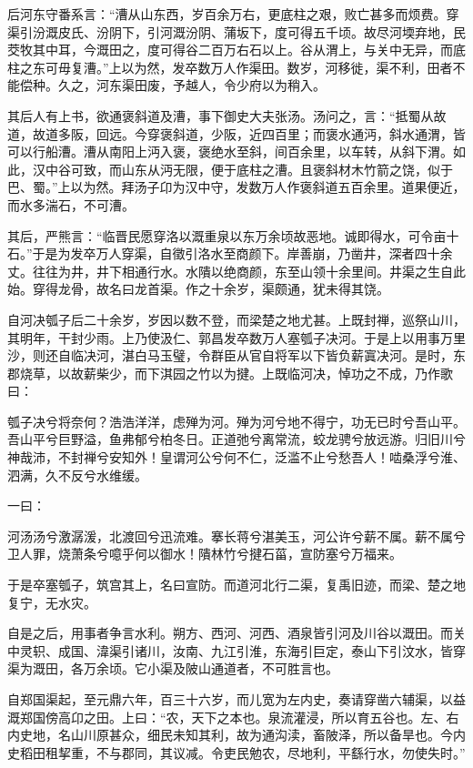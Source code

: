 \documentclass[]{article}
\begin{document}
后河东守番系言：``漕从山东西，岁百余万右，更底柱之艰，败亡甚多而烦费。穿渠引汾溉皮氏、汾阴下，引河溉汾阴、蒲坂下，度可得五千顷。故尽河堧弃地，民茭牧其中耳，今溉田之，度可得谷二百万右石以上。谷从渭上，与关中无异，而底柱之东可毋复漕。''上以为然，发卒数万人作渠田。数岁，河移徙，渠不利，田者不能偿种。久之，河东渠田废，予越人，令少府以为稍入。

其后人有上书，欲通褒斜道及漕，事下御史大夫张汤。汤问之，言：``抵蜀从故道，故道多阪，回远。今穿褒斜道，少阪，近四百里；而褒水通沔，斜水通渭，皆可以行船漕。漕从南阳上沔入褒，褒绝水至斜，间百余里，以车转，从斜下渭。如此，汉中谷可致，而山东从沔无限，便于底柱之漕。且褒斜材木竹箭之饶，似于巴、蜀。''上以为然。拜汤子卬为汉中守，发数万人作褒斜道五百余里。道果便近，而水多湍石，不可漕。

其后，严熊言：``临晋民愿穿洛以溉重泉以东万余顷故恶地。诚即得水，可令亩十石。''于是为发卒万人穿渠，自徵引洛水至商颜下。岸善崩，乃凿井，深者四十余丈。往往为井，井下相通行水。水隤以绝商颜，东至山领十余里间。井渠之生自此始。穿得龙骨，故名曰龙首渠。作之十余岁，渠颇通，犹未得其饶。

自河决瓠子后二十余岁，岁因以数不登，而梁楚之地尤甚。上既封禅，巡祭山川，其明年，干封少雨。上乃使汲仁、郭昌发卒数万人塞瓠子决河。于是上以用事万里沙，则还自临决河，湛白马玉璧，令群臣从官自将军以下皆负薪寘决河。是时，东郡烧草，以故薪柴少，而下淇园之竹以为揵。上既临河决，悼功之不成，乃作歌曰：

瓠子决兮将奈何？浩浩洋洋，虑殚为河。殚为河兮地不得宁，功无已时兮吾山平。吾山平兮巨野溢，鱼弗郁兮柏冬日。正道弛兮离常流，蛟龙骋兮放远游。归旧川兮神哉沛，不封禅兮安知外！皇谓河公兮何不仁，泛滥不止兮愁吾人！啮桑浮兮淮、泗满，久不反兮水维缓。

一曰：

河汤汤兮激潺湲，北渡回兮迅流难。搴长蒋兮湛美玉，河公许兮薪不属。薪不属兮卫人罪，烧萧条兮噫乎何以御水！隤林竹兮揵石菑，宣防塞兮万福来。

于是卒塞瓠子，筑宫其上，名曰宣防。而道河北行二渠，复禹旧迹，而梁、楚之地复宁，无水灾。

自是之后，用事者争言水利。朔方、西河、河西、酒泉皆引河及川谷以溉田。而关中灵轵、成国、湋渠引诸川，汝南、九江引淮，东海引巨定，泰山下引汶水，皆穿渠为溉田，各万余顷。它小渠及陂山通道者，不可胜言也。

自郑国渠起，至元鼎六年，百三十六岁，而儿宽为左内史，奏请穿凿六辅渠，以益溉郑国傍高卬之田。上曰：``农，天下之本也。泉流灌浸，所以育五谷也。左、右内史地，名山川原甚众，细民未知其利，故为通沟渎，畜陂泽，所以备旱也。今内史稻田租挈重，不与郡同，其议减。令吏民勉农，尽地利，平繇行水，勿使失时。''
\end{document}
